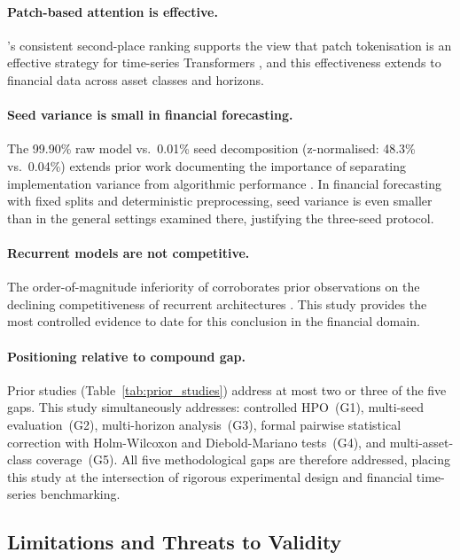 \paragraph{Patch-based attention is effective.}
\patchtst's consistent second-place ranking supports the view that patch tokenisation is an effective strategy for time-series Transformers \citep{Nie2023}, and this effectiveness extends to financial data across asset classes and horizons.

\paragraph{Seed variance is small in financial forecasting.}
The 99.90\% raw model vs.\ 0.01\% seed decomposition (z-normalised: 48.3\% vs.\ 0.04\%) extends prior work documenting the importance of separating implementation variance from algorithmic performance \citep{Bouthillier2021}.  In financial forecasting with fixed splits and deterministic preprocessing, seed variance is even smaller than in the general settings examined there, justifying the three-seed protocol.

\paragraph{Recurrent models are not competitive.}
The order-of-magnitude inferiority of \lstm corroborates prior observations on the declining competitiveness of recurrent architectures \citep{Lim2021, Hewamalage2021}.  This study provides the most controlled evidence to date for this conclusion in the financial domain.

\paragraph{Positioning relative to compound gap.}
Prior studies (Table~\ref{tab:prior_studies}) address at most two or three of the five gaps.  This study simultaneously addresses: controlled HPO~(G1), multi-seed evaluation~(G2), multi-horizon analysis~(G3), formal pairwise statistical correction with Holm-Wilcoxon and Diebold-Mariano tests~(G4), and multi-asset-class coverage~(G5).  All five methodological gaps are therefore addressed, placing this study at the intersection of rigorous experimental design and financial time-series benchmarking.

\subsection{Limitations and Threats to Validity}
\label{sec:limitations}

